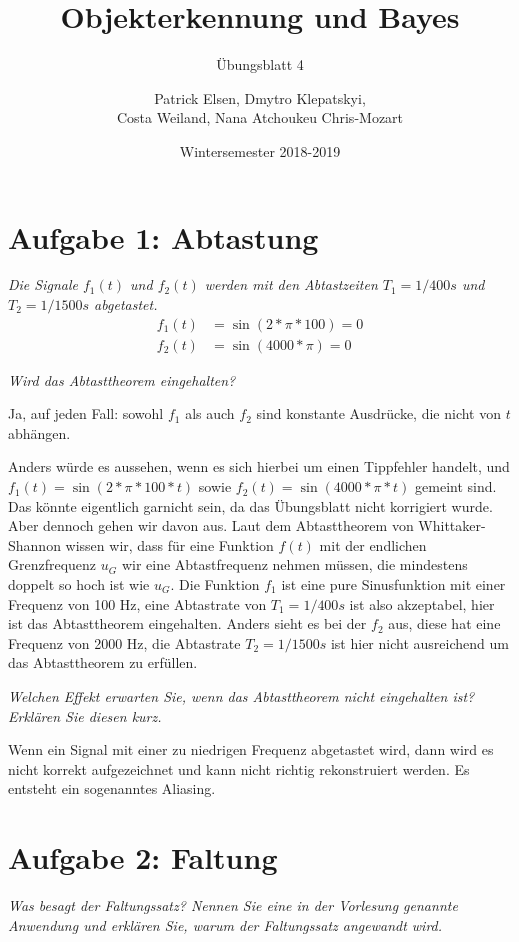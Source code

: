 \documentclass[
  ngerman,
  DIV=14
]{scrartcl}
\title{Objekterkennung und Bayes}
\subtitle{Übungsblatt 4}
\author{Patrick Elsen, Dmytro Klepatskyi,\\Costa Weiland, Nana Atchoukeu Chris-Mozart}
\date{Wintersemester 2018-2019}
\begin{document}
\maketitle

\section*{Aufgabe 1: Abtastung}

\emph{Die Signale $f_1(t)$ und $f_2(t)$ werden mit den Abtastzeiten $T_1 = 1/400s$ und $T_2 = 1/1500s$ abgetastet.}
\begin{align*}
f_1(t) &= \sin(2 * \pi * 100) = 0\\
f_2(t) &= \sin(4000 * \pi) = 0 
\end{align*}

\emph{Wird das Abtasttheorem eingehalten?}

Ja, auf jeden Fall: sowohl $f_1$ als auch $f_2$ sind konstante Ausdrücke, die nicht von $t$ abhängen.

Anders würde es aussehen, wenn es sich hierbei um einen Tippfehler handelt, und $f_1(t) = \sin(2 * \pi * 100 * t)$ sowie $f_2(t) = \sin(4000 * \pi * t)$ gemeint sind. Das könnte eigentlich garnicht sein, da das Übungsblatt nicht korrigiert wurde. Aber dennoch gehen wir davon aus. Laut dem Abtasttheorem von Whittaker-Shannon wissen wir, dass für eine Funktion $f(t)$ mit der endlichen Grenzfrequenz $u_G$ wir eine Abtastfrequenz nehmen müssen, die mindestens doppelt so hoch ist wie $u_G$. Die Funktion $f_1$ ist eine pure Sinusfunktion mit einer Frequenz von 100 Hz, eine Abtastrate von $T_1 = 1/400s$ ist also akzeptabel, hier ist das Abtasttheorem eingehalten. Anders sieht es bei der $f_2$ aus, diese hat eine Frequenz von 2000 Hz, die Abtastrate $T_2 = 1/1500s$ ist hier nicht ausreichend um das Abtasttheorem zu erfüllen. 

\emph{Welchen Effekt erwarten Sie, wenn das Abtasttheorem nicht eingehalten ist? Erklären Sie diesen kurz.}

Wenn ein Signal mit einer zu niedrigen Frequenz abgetastet wird, dann wird es nicht korrekt aufgezeichnet und kann nicht richtig rekonstruiert werden. Es entsteht ein sogenanntes Aliasing.

\section*{Aufgabe 2: Faltung}

\emph{Was besagt der Faltungssatz? Nennen Sie eine in der Vorlesung genannte Anwendung und erklären Sie, warum der Faltungssatz angewandt wird.}
\end{document}
